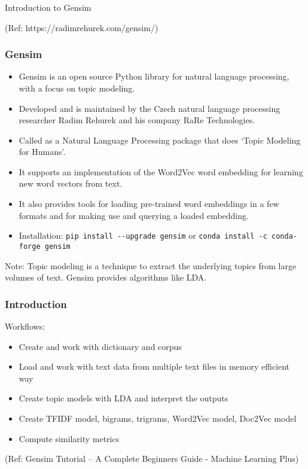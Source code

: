 \begin{frame}[fragile]\frametitle{}

\begin{center}
{\Large Introduction to Gensim}

{\tiny (Ref: https://radimrehurek.com/gensim/)}

\end{center}

\end{frame}


\begin{frame}[fragile]\frametitle{Gensim}

\begin{itemize}
\item Gensim is an open source Python library for natural language processing, with a focus on topic modeling.
\item Developed and is maintained by the Czech natural language processing researcher Radim Rehurek and his company RaRe Technologies.
\item Called as a Natural Language Processing package that does ‘Topic Modeling for Humans’. 
\item It supports an implementation of the Word2Vec word embedding for learning new word vectors from text.

\item It also provides tools for loading pre-trained word embeddings in a few formats and for making use and querying a loaded embedding.

\item Installation: \lstinline|pip install --upgrade gensim| or \lstinline|conda install -c conda-forge gensim|
\end{itemize}

\tiny{Note:  Topic modeling is a technique to extract the underlying topics from large volumes of text. Gensim provides algorithms like LDA.}
\end{frame}

\begin{frame}[fragile]\frametitle{Introduction}

Workflows:
\begin{itemize}
\item Create and work with dictionary and corpus
\item Load and work with text data from multiple text files in memory efficient way
\item Create topic models with LDA and interpret the outputs
\item Create TFIDF model, bigrams, trigrams, Word2Vec model, Doc2Vec model
\item Compute similarity metrics
\end{itemize}

\tiny{(Ref: Gensim Tutorial – A Complete Beginners Guide - Machine Learning Plus)}
\end{frame}

